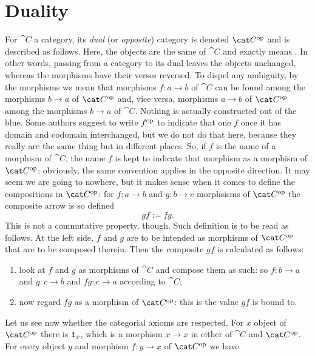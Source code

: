 
\section{Duality}

For \(\cat C\) a category, its {\em dual} (or {\em opposite}) category is denoted \(\op{\cat C}\) and is described as follows. Here, the objects are the same of \(\cat C\) and  exactly means . In other words, passing from a category to its dual leaves the objects unchanged, whereas the morphisms have their verses reversed. To dispel any ambiguity, by  the morphisms we mean that morphisms \(f : a \to b\) of \(\cat C\) can be found among the morphisms \(b \to a\) of \(\op{\cat C}\) and, vice versa, morphisms \(a \to b\) of \(\op{\cat C}\) among the morphisms \(b \to a\) of \(\cat C\). Nothing is actually constructed out of the blue. Some authors suggest to write \(f^\text{op}\) to indicate that one \(f\) once it has domain and codomain interchanged, but we do not do that here, because they really are the same thing but in different places. So, if \(f\) is the name of a morphism of \(\cat C\), the name \(f\) is kept to indicate that morphism as a morphism of \(\op{\cat C}\); obviously, the same convention applies in the opposite direction. It may seem we are going to nowhere, but it makes sense when it comes to define the compositions in \(\op{\cat C}\): for \(f : a \to b\) and \(g : b \to c\) morphsisms of \(\op{\cat C}\) the composite arrow is so defined
\[gf := fg .\label{defeqn:DualComp}\]
This is not a commutative property, though. Such definition is to be read as follows. At the left side, \(f\) and \(g\) are to be intended as morphisms of \(\op{\cat C}\) that are to be composed therein. Then the composite \(gf\) is calculated as follows:
\begin{enumerate}
\item look at \(f\) and \(g\) as morphisms of \(\cat C\) and compose them as such: so \(f : b \to a\) and \(g : c \to b\) and \(fg : c \to a\) according to \(\cat C\);
\item now regard \(fg\) as a morphism of \(\op{\cat C}\): this is the value \(gf\) is bound to.
\end{enumerate}
Let us see now whether the categorial axioms are respected. For \(x\) object of \(\op {\cat C}\) there is \(\mathtt 1_x\), which is a morphism \(x \to x\) in either of \(\cat C\) and \(\op{\cat C}\). For every object \(y\) and morphism \(f : y \to x\) of \(\op{\cat C}\) we have
